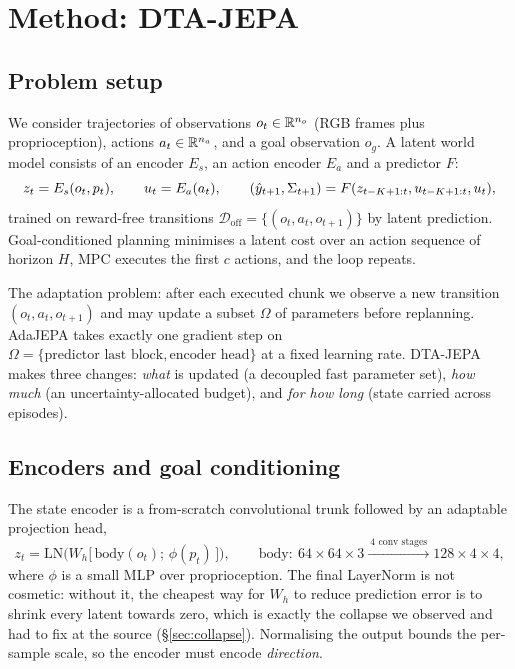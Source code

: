 \section{Method: DTA-JEPA}\label{sec:model}

\subsection{Problem setup}

We consider trajectories of observations $o_t\in\mathbb{R}^{n_o}$ (RGB frames plus proprioception),
actions $a_t\in\mathbb{R}^{n_a}$, and a goal observation $o_g$. A latent world model consists of an
encoder $E_s$, an action encoder $E_a$ and a predictor $F$:
\begin{equation}
z_t = E_s(o_t,p_t),\qquad u_t = E_a(a_t),\qquad
(\hat{y}_{t+1},\Sigma_{t+1}) = F(z_{t-K+1:t},u_{t-K+1:t},u_t),
\end{equation}
trained on reward-free transitions $\mathcal D_{\mathrm{off}}=\{(o_t,a_t,o_{t+1})\}$ by latent
prediction. Goal-conditioned planning minimises a latent cost over an action sequence of
horizon $H$, MPC executes the first $c$ actions, and the loop repeats.

The adaptation problem: after each executed chunk we observe a new transition
$(o_t,a_t,o_{t+1})$ and may update a subset $\Omega$ of parameters before replanning. AdaJEPA
takes exactly one gradient step on $\Omega=\{\text{predictor last block},\text{encoder head}\}$
at a fixed learning rate. DTA-JEPA makes three changes: \emph{what} is updated (a decoupled
fast parameter set), \emph{how much} (an uncertainty-allocated budget), and \emph{for how
long} (state carried across episodes).

\subsection{Encoders and goal conditioning}\label{sec:enc}

The state encoder is a from-scratch convolutional trunk followed by an adaptable projection
head,
\begin{equation}
z_t = \mathrm{LN}\!\Big(W_h\big[\,\mathrm{body}(o_t);\,\phi(p_t)\,\big]\Big),\qquad
\mathrm{body}:\ 64{\times}64{\times}3 \xrightarrow{\ \text{4 conv stages}\ } 128{\times}4{\times}4,
\end{equation}
where $\phi$ is a small MLP over proprioception. The final LayerNorm is not cosmetic: without
it, the cheapest way for $W_h$ to reduce prediction error is to shrink every latent towards
zero, which is exactly the collapse we observed and had to fix at the source
(\S\ref{sec:collapse}). Normalising the output bounds the per-sample scale, so the encoder must
encode \emph{direction}.

